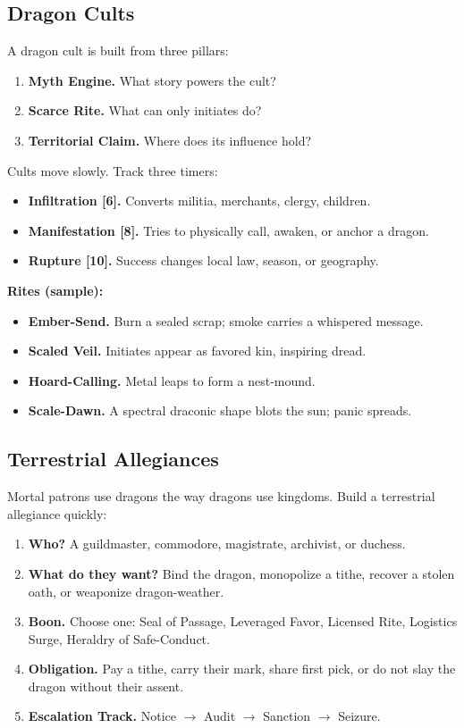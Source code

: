 \subsection*{Dragon Cults}

A dragon cult is built from three pillars:
\begin{enumerate}
  \item \textbf{Myth Engine.} What story powers the cult?
  \item \textbf{Scarce Rite.} What can only initiates do?
  \item \textbf{Territorial Claim.} Where does its influence hold?
\end{enumerate}

Cults move slowly. Track three timers:
\begin{itemize}
  \item \textbf{Infiltration [6].} Converts militia, merchants, clergy, children.
  \item \textbf{Manifestation [8].} Tries to physically call, awaken, or anchor a dragon.
  \item \textbf{Rupture [10].} Success changes local law, season, or geography.
\end{itemize}

\noindent
\textbf{Rites (sample):}
\begin{itemize}
  \item \textbf{Ember-Send.} Burn a sealed scrap; smoke carries a whispered message.
  \item \textbf{Scaled Veil.} Initiates appear as favored kin, inspiring dread.
  \item \textbf{Hoard-Calling.} Metal leaps to form a nest-mound.
  \item \textbf{Scale-Dawn.} A spectral draconic shape blots the sun; panic spreads.
\end{itemize}

\subsection*{Terrestrial Allegiances}

Mortal patrons use dragons the way dragons use kingdoms. Build a terrestrial allegiance quickly:

\begin{enumerate}
  \item \textbf{Who?} A guildmaster, commodore, magistrate, archivist, or duchess.
  \item \textbf{What do they want?} Bind the dragon, monopolize a tithe, recover a stolen oath, or weaponize dragon-weather.
  \item \textbf{Boon.} Choose one: Seal of Passage, Leveraged Favor, Licensed Rite, Logistics Surge, Heraldry of Safe-Conduct.
  \item \textbf{Obligation.} Pay a tithe, carry their mark, share first pick, or do not slay the dragon without their assent.
  \item \textbf{Escalation Track.} Notice $\rightarrow$ Audit $\rightarrow$ Sanction $\rightarrow$ Seizure.
\end{enumerate}

